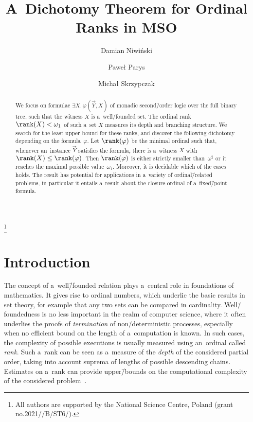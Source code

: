 \documentclass{lmcs}
\numberwithin{equation}{section}
\numberwithin{figure}{section}
\begin{document}
\title[A~Dichotomy Theorem for Ordinal Ranks in MSO]{A~Dichotomy Theorem for Ordinal Ranks in MSO\rsuper*}

\author[D. Niwiński]{Damian Niwiński}
\author[P. Parys]{Paweł Parys}
\author[M. Skrzypczak]{Michał Skrzypczak}

\address{Institute of Informatics, University of Warsaw, Poland}

\thanks{All authors are supported by the National Science Centre, Poland (grant no.\@ 2021//\allowbreak B/\allowbreak ST6/).}

\begin{abstract}
	We focus on formulae $\exists X.\, \varphi(\vec{Y}, X)$ of monadic second\=/order logic over the full binary tree, such that the witness $X$ is a~well\=/founded set.
	The ordinal rank $\rank(X) < \omega_1$ of such a~set $X$ measures its depth and branching structure.
	We search for the least upper bound for these ranks, and discover the following dichotomy depending on the formula~$\varphi$.
	Let $\rank(\varphi)$ be the minimal ordinal such that, whenever an~instance $\vec{Y}$ satisfies the formula, there is a~witness $X$ with $\rank(X) \leq \rank(\varphi)$.
	Then $\rank(\varphi)$ is either strictly smaller than~$\omega^2$ or it reaches the maximal possible value~$\omega_1$.
	Moreover, it is decidable which of the cases holds.
	The result has potential for applications in a~variety of ordinal\=/related problems, in particular it entails a~result about the closure ordinal of a~fixed\=/point formula.
\end{abstract}

\maketitle

\section{Introduction}
\label{sec:intro}

The concept of a~well\=/founded relation plays a~central role in foundations of mathematics.
It gives rise to ordinal numbers, which underlie the basic results in set theory, for example that any two sets can be compared in cardinality.
Well\=/foundedness is no less important in the realm of computer science, where it often underlies the proofs of \emph{termination} of non\=/deterministic processes,
especially when no efficient bound on the length of a~computation is known.
In such cases, the complexity of possible executions is usually measured using an~ordinal called \emph{rank}.
Such a~rank can be seen as a~measure of the \emph{depth} of the considered partial order, taking into account suprema of lengths of possible descending chains.
Estimates on a~rank can provide upper\=/bounds on the computational complexity of the considered problem~\cite{schmitz_hab}.
\end{document}

